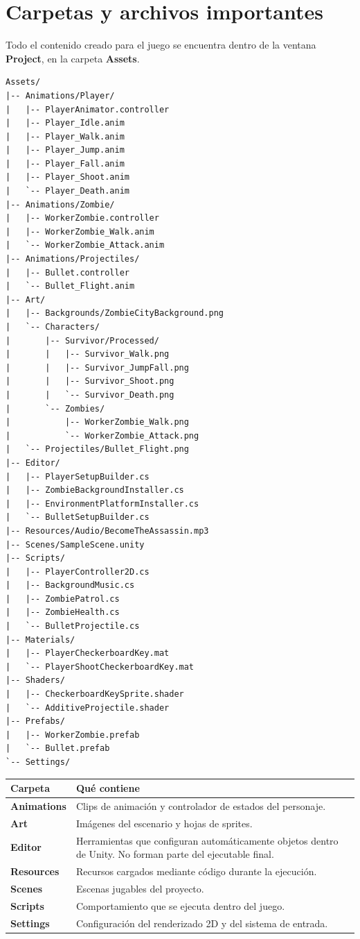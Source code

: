 \documentclass[11pt,a4paper]{article}
\begin{document}
\section{Carpetas y archivos importantes}

Todo el contenido creado para el juego se encuentra dentro de la ventana \textbf{Project}, en la carpeta \textbf{Assets}.

\begin{lstlisting}[style=projecttree]
Assets/
|-- Animations/Player/
|   |-- PlayerAnimator.controller
|   |-- Player_Idle.anim
|   |-- Player_Walk.anim
|   |-- Player_Jump.anim
|   |-- Player_Fall.anim
|   |-- Player_Shoot.anim
|   `-- Player_Death.anim
|-- Animations/Zombie/
|   |-- WorkerZombie.controller
|   |-- WorkerZombie_Walk.anim
|   `-- WorkerZombie_Attack.anim
|-- Animations/Projectiles/
|   |-- Bullet.controller
|   `-- Bullet_Flight.anim
|-- Art/
|   |-- Backgrounds/ZombieCityBackground.png
|   `-- Characters/
|       |-- Survivor/Processed/
|       |   |-- Survivor_Walk.png
|       |   |-- Survivor_JumpFall.png
|       |   |-- Survivor_Shoot.png
|       |   `-- Survivor_Death.png
|       `-- Zombies/
|           |-- WorkerZombie_Walk.png
|           `-- WorkerZombie_Attack.png
|   `-- Projectiles/Bullet_Flight.png
|-- Editor/
|   |-- PlayerSetupBuilder.cs
|   |-- ZombieBackgroundInstaller.cs
|   |-- EnvironmentPlatformInstaller.cs
|   `-- BulletSetupBuilder.cs
|-- Resources/Audio/BecomeTheAssassin.mp3
|-- Scenes/SampleScene.unity
|-- Scripts/
|   |-- PlayerController2D.cs
|   |-- BackgroundMusic.cs
|   |-- ZombiePatrol.cs
|   |-- ZombieHealth.cs
|   `-- BulletProjectile.cs
|-- Materials/
|   |-- PlayerCheckerboardKey.mat
|   `-- PlayerShootCheckerboardKey.mat
|-- Shaders/
|   |-- CheckerboardKeySprite.shader
|   `-- AdditiveProjectile.shader
|-- Prefabs/
|   |-- WorkerZombie.prefab
|   `-- Bullet.prefab
`-- Settings/
\end{lstlisting}

\begin{tabularx}{\textwidth}{>{\bfseries}p{}X}
\toprule
Carpeta & Qué contiene \\
\midrule
Animations & Clips de animación y controlador de estados del personaje. \\
Art & Imágenes del escenario y hojas de sprites. \\
Editor & Herramientas que configuran automáticamente objetos dentro de Unity. No forman parte del ejecutable final. \\
Resources & Recursos cargados mediante código durante la ejecución. \\
Scenes & Escenas jugables del proyecto. \\
Scripts & Comportamiento que se ejecuta dentro del juego. \\
Settings & Configuración del renderizado 2D y del sistema de entrada. \\
\bottomrule
\end{tabularx}
\end{document}
